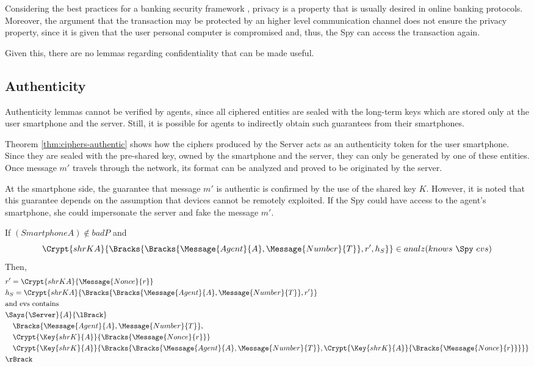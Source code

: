 Considering the best practices for a banking security framework \cite{Hutchinson2003}, privacy is a property that is usually desired in online banking protocols. Moreover, the argument that the transaction may be protected by an higher level communication channel does not ensure the privacy property, since it is given that the user personal computer is compromised and, thus, the Spy can access the transaction again.

Given this, there are no lemmas regarding confidentiality that can be made useful.



\subsection{Authenticity}
Authenticity lemmas cannot be verified by agents, since all ciphered entities are sealed with the long-term keys which are stored only at the user smartphone and the server. Still, it is possible for agents to indirectly obtain such guarantees from their smartphones.

Theorem \ref{thm:ciphers-authentic} shows how the ciphers produced by the Server acts as an authenticity token for the user smartphone. Since they are sealed with the pre-shared key, owned by the smartphone and the server, they can only be generated by one of these entities. Once message \(m'\) travels through the network, its format can be analyzed and proved to be originated by the server. 

At the smartphone side, the guarantee that message \(m'\) is authentic is confirmed by the use of the shared key \(K\). However, it is noted that this guarantee depends on the assumption that devices cannot be remotely exploited. If the Spy could have access to the agent's smartphone, she could impersonate the server and fake the message \(m'\). 

\begin{theorem}
\label{thm:ciphers-authentic}
  If $(Smartphone A) \notin badP$ and \\ 
  \[\Crypt{shrK A}{\Bracks{\Bracks{\Message{Agent}{A}, \Message{Number}{T}}, r', h_S}} \in analz(knows\ \Spy\ evs)\]
  Then,
  \begin{align*}
    & r' = \Crypt{shrK A}{\Message{Nonce}{r}} \\
    & h_S = \Crypt{shrK A}{\Bracks{\Bracks{\Message{Agent}{A}, \Message{Number}{T}}, r'}} \\
    & \text{and evs contains} \\
    & \Says{\Server}{A}{\lBrack} \\
      & \quad \Bracks{\Message{Agent}{A}, \Message{Number}{T}}, \\
      & \quad \Crypt{\Key{shrK}{A}}{\Bracks{\Message{Nonce}{r}}} \\
      & \quad \Crypt{\Key{shrK}{A}}{\Bracks{\Bracks{\Message{Agent}{A}, \Message{Number}{T}},\Crypt{\Key{shrK}{A}}{\Bracks{\Message{Nonce}{r}}}}} \\
    & \rBrack
  \end{align*}
\end{theorem}

